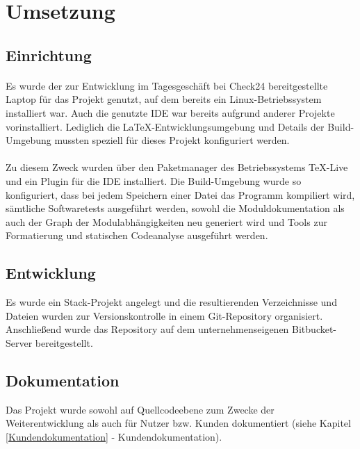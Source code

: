 \section{Umsetzung}

\subsection{Einrichtung}
\paragraph{}
Es wurde der zur Entwicklung im Tagesgeschäft bei Check24 bereitgestellte Laptop
für das Projekt genutzt, auf dem bereits ein Linux-Betriebssystem installiert war.
Auch die genutzte \gls{IDE} war bereits aufgrund anderer Projekte vorinstalliert.
Lediglich die \LaTeX-Entwicklungsumgebung und Details der Build-Umgebung mussten
speziell für dieses Projekt konfiguriert werden.

\paragraph{}
Zu diesem Zweck wurden über den Paketmanager des Betriebssystems \TeX-Live \cite{texlive}
und ein Plugin für die \gls{IDE} \cite{latex-workshop} installiert. Die Build-Umgebung
wurde so konfiguriert, dass bei jedem Speichern einer Datei das Programm kompiliert wird,
sämtliche Softwaretests ausgeführt werden, sowohl die Moduldokumentation als auch
der Graph der Modulabhängigkeiten neu generiert wird und Tools zur Formatierung
und statischen Codeanalyse ausgeführt werden.

\subsection{Entwicklung}
Es wurde ein Stack-Projekt \cite{stack} angelegt und die resultierenden
Verzeichnisse und Dateien wurden zur Versionskontrolle in einem Git\cite{git}-Repository organisiert.
Anschließend wurde das Repository auf dem unternehmenseigenen Bitbucket-Server \cite{bitbucket}
bereitgestellt.

\subsection{Dokumentation}
Das Projekt wurde sowohl auf Quellcodeebene zum Zwecke der Weiterentwicklung als
auch für Nutzer bzw. Kunden dokumentiert (siehe Kapitel \ref{Kundendokumentation} - Kundendokumentation).

